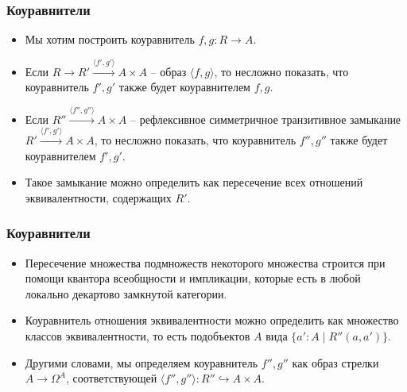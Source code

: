 \documentclass{beamer}
\theoremstyle{definition}
\begin{document}
\begin{frame}
\frametitle{Коуравнители}
\begin{itemize}
\item Мы хотим построить коуравнитель $f,g : R \to A$.
\item Если $R \to R' \xrightarrow{\langle f', g' \rangle} A \times A$ -- образ $\langle f, g \rangle$, то несложно показать, что коуравнитель $f',g'$ также будет коуравнителем $f,g$.
\item Если $R'' \xrightarrow{\langle f'', g'' \rangle} A \times A$ -- рефлексивное симметричное транзитивное замыкание $R' \xrightarrow{\langle f', g' \rangle} A \times A$, то несложно показать, что коуравнитель $f'',g''$ также будет коуравнителем $f',g'$.
\item Такое замыкание можно определить как пересечение всех отношений эквивалентности, содержащих $R'$.
\end{itemize}
\end{frame}

\begin{frame}
\frametitle{Коуравнители}
\begin{itemize}
\item Пересечение множества подмножеств некоторого множества строится при помощи квантора всеобщности и импликации, которые есть в любой локально декартово замкнутой категории.
\item Коуравнитель отношения эквивалентности можно определить как множество классов эквивалентности, то есть подобъектов $A$ вида $\{ a' : A \mid R''(a,a') \}$.
\item Другими словами, мы определяем коуравнитель $f'',g''$ как образ стрелки $A \to \Omega^A$, соответствующей $\langle f'', g'' \rangle : R'' \hookrightarrow A \times A$.
\end{itemize}
\end{frame}
\end{document}

